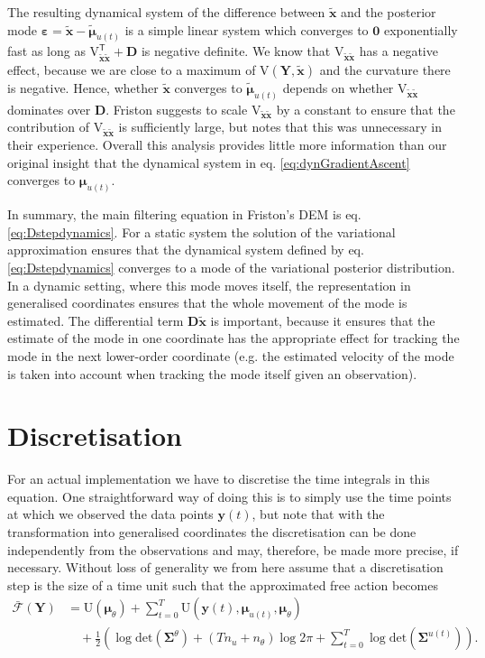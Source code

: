 \documentclass[a4paper,10pt]{article}
\newcommand{\bs}[1]{\mathbf{#1}}					%
\newcommand{\bgs}[1]{\boldsymbol{#1}}				%
\newcommand{\tr}{\mathsf{T}}				%
\newcommand{\gc}[1]{\tilde{#1}} %
\renewcommand{\ss}{u}         %
\newcommand{\so}{y}         %
\newcommand{\sh}{x}         %
\newcommand{\spm}{\mu}    %
\renewcommand{\sp}{\theta}    %
\newcommand{\po}{\bs{\so}}    %
\newcommand{\ph}{\bs{\sh}}    %
\newcommand{\ppm}{\bgs{\spm}}   %
\newcommand{\phg}{\gc{\ph}}    %
\newcommand{\ppmg}{\gc{\ppm}} %
\newcommand{\Po}{\bs{Y}}    %
\newcommand{\D}{\bs{D}}				%
\newcommand{\U}{\mathrm{U}}			%
\newcommand{\V}{\mathrm{V}}			%
\newcommand{\Fa}{\bar{\mathcal{F}}}		%
\newcommand{\Cov}{\bgs{\Sigma}}			%
\renewcommand{\det}[1]{\mathrm{det}(#1)}	%
\begin{document}
The resulting dynamical system of the difference between $\phg$ and the posterior mode $\bgs{\varepsilon} = \phg - \ppmg_{\ss(t)}$ is a simple linear system which converges to $\bs{0}$ exponentially fast as long as $\V_{\phg\phg}^\tr + \D$ is negative definite. We know that $\V_{\phg\phg}$ has a negative effect, because we are close to a maximum of $\V(\Po,\phg)$ and the curvature there is negative. Hence, whether $\phg$ converges to $\ppmg_{\ss(t)}$ depends on whether $\V_{\phg\phg}$ dominates over $\D$. Friston suggests to scale $\V_{\phg\phg}$ by a constant to ensure that the contribution of $\V_{\phg\phg}$ is sufficiently large, but notes that this was unnecessary in their experience. Overall this analysis provides little more information than our original insight that the dynamical system in eq. \eqref{eq:dynGradientAscent} converges to $\ppm_{\ss(t)}$.

In summary, the main filtering equation in Friston's DEM is eq. \eqref{eq:Dstepdynamics}. For a static system the solution of the variational approximation ensures that the dynamical system defined by eq. \eqref{eq:Dstepdynamics} converges to a mode of the variational posterior distribution. In a dynamic setting, where this mode moves itself, the representation in generalised coordinates ensures that the whole movement of the mode is estimated. The differential term $\D\phg$ is important, because it ensures that the estimate of the mode in one coordinate has the appropriate effect for tracking the mode in the next lower-order coordinate (e.g. the estimated velocity of the mode is taken into account when tracking the mode itself given an observation). 


\section{Discretisation}
For an actual implementation we have to discretise the time integrals in this equation. One straightforward way of doing this is to simply use the time points at which we observed the data points $\po(t)$, but note that with the transformation into generalised coordinates the discretisation can be done independently from the observations and may, therefore, be made more precise, if necessary. Without loss of generality we from here assume that a discretisation step is the size of a time unit such that the approximated free action becomes
\begin{align}
    \Fa(\Po) &= \label{eq:approxFreeActionDisc} \U(\bgs{\mu}_\sp) + \sum_{t=0}^T  \U(\po(t),\bgs{\mu}_{\ss(t)},\bgs{\mu}_\sp) \nonumber\\
    &\quad + \frac{1}{2} \left(\log \det{\Cov^\sp} + (Tn_\ss + n_{\sp}) \log 2\pi + \sum_{t=0}^T \log \det{\Cov^{\ss(t)}}\right).
\end{align}




\end{document}

